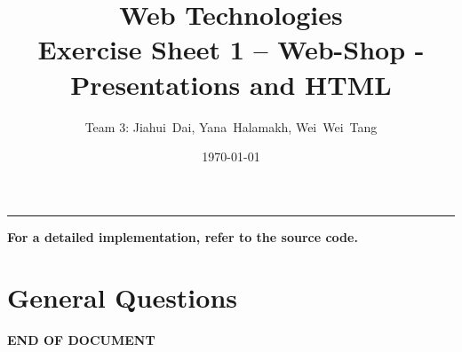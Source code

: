 \documentclass[a4paper,12pt]{article} %
\title{Web Technologies \\
        \large{Exercise Sheet 1 -- Web-Shop - Presentations and HTML}} %
\author{Team 3: Jiahui~Dai, Yana~Halamakh, Wei~Wei~Tang} %
\date{\today} %
\begin{document}
\maketitle %
\hrule %
\tableofcontents %
\textbf{For a detailed implementation, refer to the source code.}
\newpage


\section{General Questions}

















\begin{center}
    \vspace{5em}
    \textbf{END OF DOCUMENT}
\end{center}
\end{document}
